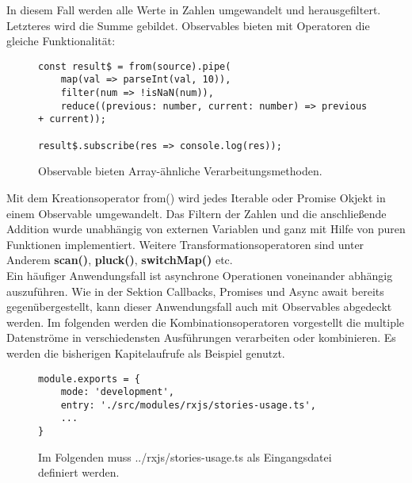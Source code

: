 \noindent
In diesem Fall werden alle Werte in Zahlen umgewandelt und herausgefiltert. Letzteres wird die Summe gebildet. Observables bieten mit Operatoren die gleiche Funktionalität:

\begin{figure}[H]
\begin{lstlisting}[basicstyle=\small]
const result$ = from(source).pipe(
    map(val => parseInt(val, 10)),
    filter(num => !isNaN(num)),
    reduce((previous: number, current: number) => previous + current));

result$.subscribe(res => console.log(res));
\end{lstlisting}
\caption{Observable bieten Array-ähnliche Verarbeitungsmethoden.}
\end{figure}

\noindent
Mit dem Kreationsoperator from() wird jedes Iterable oder Promise Okjekt in einem Observable umgewandelt. Das Filtern der Zahlen und die anschließende Addition wurde unabhängig von externen Variablen und ganz mit Hilfe von puren Funktionen implementiert. Weitere Transformationsoperatoren sind unter Anderem \textbf{scan()}, \textbf{pluck()}, \textbf{switchMap()} etc.\\

\noindent
Ein häufiger Anwendungsfall ist asynchrone Operationen voneinander abhängig auszuführen. Wie in der Sektion Callbacks, Promises und Async await bereits gegenübergestellt, kann dieser Anwendungsfall auch mit Observables abgedeckt werden. Im folgenden werden die Kombinationsoperatoren vorgestellt die multiple Datenströme in verschiedensten Ausführungen verarbeiten oder kombinieren. Es werden die bisherigen Kapitelaufrufe als Beispiel genutzt. 

\begin{figure}[H]
\begin{lstlisting}[basicstyle=\small]
module.exports = {
    mode: 'development',
    entry: './src/modules/rxjs/stories-usage.ts',
    ...
}
\end{lstlisting}
\caption{Im Folgenden muss ../rxjs/stories-usage.ts als Eingangsdatei definiert werden.}
\end{figure}

